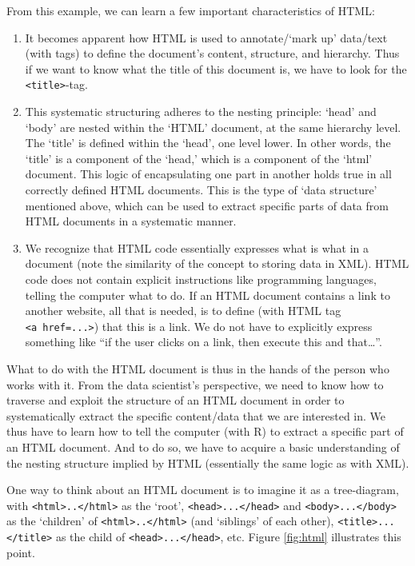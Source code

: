 \documentclass[
  12pt,
]{style/krantz}
\providecommand{\tightlist}{%
  \setlength{\itemsep}{0pt}\setlength{\parskip}{0pt}}
\begin{document}
From this example, we can learn a few important characteristics of HTML:

\begin{enumerate}
\def\labelenumi{\arabic{enumi}.}
\tightlist
\item
  It becomes apparent how HTML is used to annotate/`mark up' data/text (with tags) to define the document's content, structure, and hierarchy. Thus if we want to know what the title of this document is, we have to look for the \texttt{\textless{}title\textgreater{}}-tag.
\item
  This systematic structuring adheres to the nesting principle: `head' and `body' are nested within the `HTML' document, at the same hierarchy level. The `title' is defined within the `head', one level lower. In other words, the `title' is a component of the `head,' which is a component of the `html' document. This logic of encapsulating one part in another holds true in all correctly defined HTML documents. This is the type of `data structure' mentioned above, which can be used to extract specific parts of data from HTML documents in a systematic manner.
\item
  We recognize that HTML code essentially expresses what is what in a document (note the similarity of the concept to storing data in XML). HTML code does not contain explicit instructions like programming languages, telling the computer what to do. If an HTML document contains a link to another website, all that is needed, is to define (with HTML tag \texttt{\textless{}a\ href=...\textgreater{}}) that this is a link. We do not have to explicitly express something like ``if the user clicks on a link, then execute this and that\ldots{}''.
\end{enumerate}

What to do with the HTML document is thus in the hands of the person who works with it. From the data scientist's perspective, we need to know how to traverse and exploit the structure of an HTML document in order to systematically extract the specific content/data that we are interested in. We thus have to learn how to tell the computer (with R) to extract a specific part of an HTML document. And to do so, we have to acquire a basic understanding of the nesting structure implied by HTML (essentially the same logic as with XML).

One way to think about an HTML document is to imagine it as a tree-diagram, with \texttt{\textless{}html\textgreater{}..\textless{}/html\textgreater{}} as the `root', \texttt{\textless{}head\textgreater{}...\textless{}/head\textgreater{}} and \texttt{\textless{}body\textgreater{}...\textless{}/body\textgreater{}} as the `children' of \texttt{\textless{}html\textgreater{}..\textless{}/html\textgreater{}} (and `siblings' of each other), \texttt{\textless{}title\textgreater{}...\textless{}/title\textgreater{}} as the child of \texttt{\textless{}head\textgreater{}...\textless{}/head\textgreater{}}, etc. Figure \ref{fig:html} illustrates this point.
\end{document}
